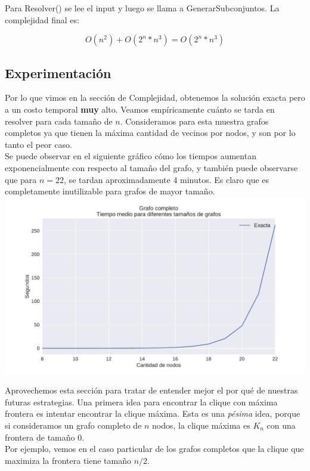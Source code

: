 Para Resolver() se lee el input y luego se llama a GenerarSubconjuntos. La complejidad final es:

$$ O(n^2) + O(2^{n} * n^{3}) = O(2^{n} * n^{3})$$

\subsection{Experimentación}

Por lo que vimos en la sección de Complejidad, obtenemos la solución exacta pero a un costo temporal \textbf{muy} alto. Veamos empíricamente cuánto se tarda en resolver para cada tamaño de $n$. Consideramos para esta muestra grafos completos ya que tienen la máxima cantidad de vecinos por nodos, y son por lo tanto el peor caso. \\

Se puede observar en el siguiente gráfico cómo los tiempos aumentan exponencialmente con respecto al tamaño del grafo, y también puede observarse que para $n = 22$, se tardan aproximadamente 4 minutos. Es claro que es completamente inutilizable para grafos de mayor tamaño. \\

{\centering
    \includegraphics[width=1\textwidth]{informe/imgs/exp_completo_tiempo_exacta.pdf} \\
}

Aprovechemos esta sección para tratar de entender mejor el por qué de nuestras futuras estrategias. Una primera idea para encontrar la clique con máxima frontera es intentar encontrar la clique máxima. Esta es una \textit{pésima} idea, porque si consideramos un grafo completo de $n$ nodos, la clique máxima es $K_n$ con una frontera de tamaño 0. \\

Por ejemplo, vemos en el caso particular de los grafos completos que la clique que maximiza la frontera tiene tamaño $n/2$.

